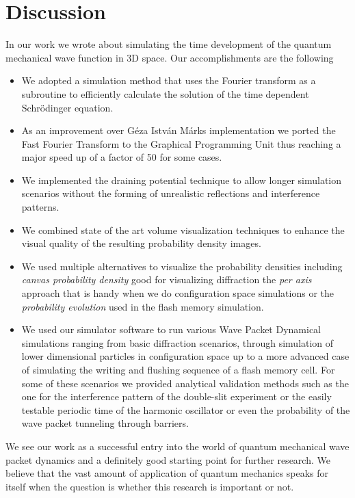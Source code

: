 \section{Discussion}
\label{sec:discussion}

In our work we wrote about simulating the time development of the quantum mechanical wave function in 3D space.
Our accomplishments are the following
\begin{itemize}
	\item We adopted a simulation method that uses the Fourier transform as a subroutine to efficiently calculate the solution of the time dependent Schrödinger equation.
	\item As an improvement over Géza István Márks implementation we ported the Fast Fourier Transform to the Graphical Programming Unit thus reaching a major speed up of a factor of 50 for some cases.
	\item We implemented the draining potential technique to allow longer simulation scenarios without the forming of unrealistic reflections and interference patterns.
	\item We combined state of the art volume visualization techniques to enhance the visual quality of the resulting probability density images.
	\item We used multiple alternatives to visualize the probability densities including \textit{canvas probability density} good for visualizing diffraction the \textit{per axis} approach that is handy when we do configuration space simulations or the \textit{probability evolution} used in the flash memory simulation.
	\item We used our simulator software to run various Wave Packet Dynamical simulations ranging from basic diffraction scenarios, through simulation of lower dimensional particles in configuration space up to a more advanced case of simulating the writing and flushing sequence of a flash memory cell. For some of these scenarios we provided analytical validation methods such as the one for the interference pattern of the double-slit experiment or the easily testable periodic time of the harmonic oscillator or even the probability of the wave packet tunneling through barriers.
\end{itemize}
We see our work as a successful entry into the world of quantum mechanical wave packet dynamics and a definitely good starting point for further research.
We believe that the vast amount of application of quantum mechanics speaks for itself when the question is whether this research is important or not.
